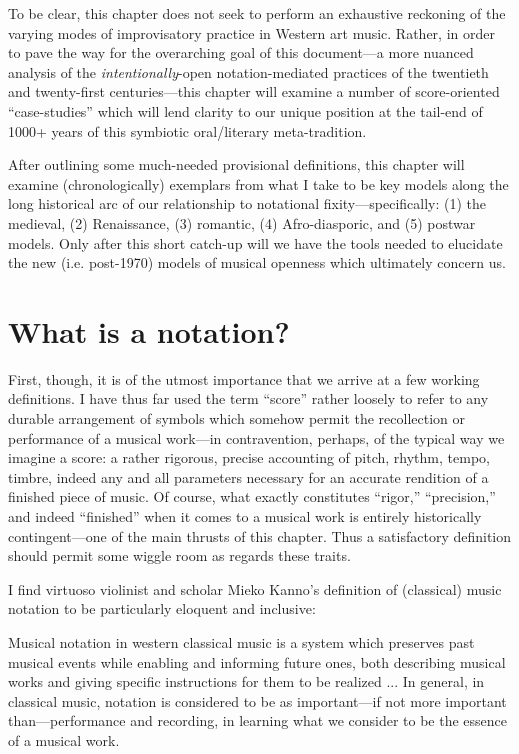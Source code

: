     To be clear, this chapter does not seek to perform an exhaustive reckoning of the varying modes of improvisatory practice in Western art music. Rather, in order to pave the way for the overarching goal of this document---a more nuanced analysis of the \textit{intentionally}-open notation-mediated practices of the twentieth and twenty-first centuries---this chapter will examine a number of score-oriented ``case-studies''  which will lend clarity to our unique position at the tail-end of 1000+ years of this symbiotic oral/literary meta-tradition.

    After outlining some much-needed provisional definitions, this chapter will examine (chronologically) exemplars from what I take to be key models along the long historical arc of our relationship to notational fixity---specifically: (1) the medieval, (2) Renaissance, (3) romantic, (4) Afro-diasporic, and (5) postwar models. Only after this short catch-up will we have the tools needed to elucidate the new (i.e. post-1970) models of musical openness which ultimately concern us.

\section{What is a notation?}

    First, though, it is of the utmost importance that we arrive at a few working definitions. I have thus far used the term ``score'' rather loosely to refer to any durable arrangement of symbols which somehow permit the recollection or performance of a musical work---in contravention, perhaps, of the typical way we imagine a score: a rather rigorous, precise accounting of pitch, rhythm, tempo, timbre, indeed any and all parameters necessary for an accurate rendition of a finished piece of music. Of course, what exactly constitutes ``rigor,'' ``precision,'' and indeed ``finished'' when it comes to a musical work is entirely historically contingent---one of the main thrusts of this chapter. Thus a satisfactory definition should permit some wiggle room as regards these traits.

    I find virtuoso violinist and scholar Mieko Kanno's definition of (classical) music notation to be particularly eloquent and inclusive:

        \begin{smallquote}
        Musical notation in western classical music is a system which preserves past musical events while enabling and informing future ones, both describing musical works and giving specific instructions for them to be realized ... In general, in classical music, notation is considered to be as important---if not more important than---performance and recording, in learning what we consider to be the essence of a musical work.\autocite{Kanno_2007}
        \end{smallquote}
        

